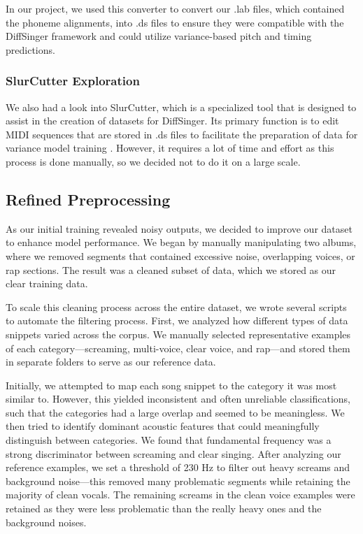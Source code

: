\documentclass[a4paper]{article}
\begin{document}
	In our project, we used this converter to convert our .lab files, which contained the phoneme alignments, into .ds files to ensure they were compatible with the DiffSinger framework and could utilize variance-based pitch and timing predictions.
	
	\subsubsection{SlurCutter Exploration}
	We also had a look into SlurCutter, which is a specialized tool that is designed to assist in the creation of datasets for DiffSinger. Its primary function is to edit MIDI sequences that are stored in .ds files to facilitate the preparation of data for variance model training \cite{openvpi}. However, it requires a lot of time and effort as this process is done manually, so we decided not to do it on a large scale.
	
	
	
	\subsection{Refined Preprocessing}
	As our initial training revealed noisy outputs, we decided to improve our dataset to enhance model performance. We began by manually manipulating two albums, where we removed segments that contained excessive noise, overlapping voices, or rap sections. The result was a cleaned subset of data, which we stored as our clear training data.
	
	To scale this cleaning process across the entire dataset, we wrote several scripts to automate the filtering process. First, we analyzed how different types of data snippets varied across the corpus. We manually selected representative examples of each category—screaming, multi-voice, clear voice, and rap—and stored them in separate folders to serve as our reference data.
	
	Initially, we attempted to map each song snippet to the category it was most similar to. However, this yielded inconsistent and often unreliable classifications, such that the categories had a large overlap and seemed to be meaningless. We then tried to identify dominant acoustic features that could meaningfully distinguish between categories. We found that fundamental frequency was a strong discriminator between screaming and clear singing. After analyzing our reference examples, we set a threshold of 230 Hz to filter out heavy screams and background noise—this removed many problematic segments while retaining the majority of clean vocals. The remaining screams in the clean voice examples were retained as they were less problematic than the really heavy ones and the background noises.
	
\end{document}
